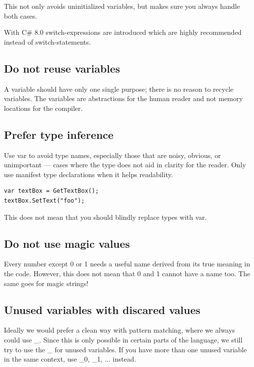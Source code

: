 \documentclass[11pt,a4paper]{article}
\begin{document}
This not only avoids uninitialized variables, but makes sure you always handle both cases.

With C\# 8.0 switch-expressions are introduced which are highly recommended instead of switch-statements.

\subsection{Do not reuse variables}

A variable should have only one single purpose; there is no reason to recycle variables. The variables are abstractions for the human reader and not memory locations for the compiler.

\subsection{Prefer type inference}

Use var to avoid type names, especially those that are noisy, obvious, or unimportant — cases where the type does not aid in clarity for the reader. Only use manifest type declarations when it helps readability.

\begin{lstlisting}[language={[Sharp]C}, caption={Type inference}]
var textBox = GetTextBox();
textBox.SetText("foo");
\end{lstlisting}

This does not mean that you should blindly replace types with var.

\subsection{Do not use magic values}

Every number except 0 or 1 needs a useful name derived from its true meaning in the code. However, this does not mean that 0 and 1 cannot have a name too.
The same goes for magic strings!

\subsection{Unused variables with discared values}

Ideally we would prefer a clean way with pattern matching, where we always could use \_. Since this is only possible in certain parts of the language, we still try to use the \_ for unused variables. If you have more than one unused variable in the same context, use \_0, \_1, ... instead.
\end{document}
